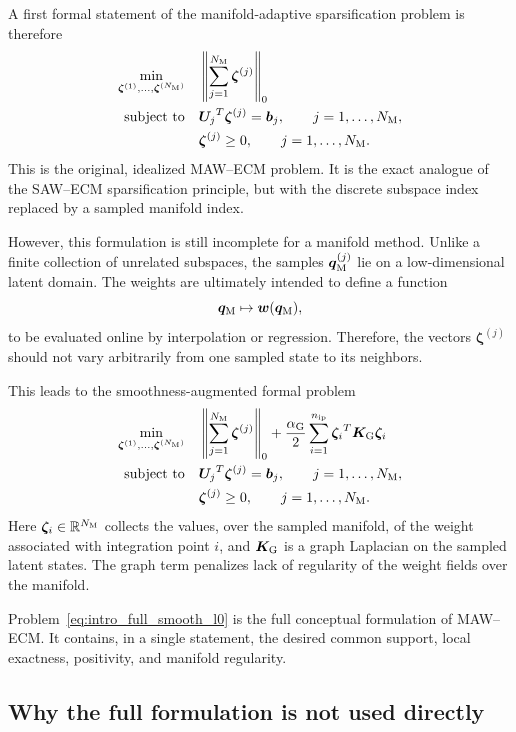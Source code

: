 \documentclass[11pt,a4paper]{article}
\begin{document}
A first formal statement of the manifold-adaptive sparsification problem is
therefore
\[
\begin{aligned}
\min_{\bm\zeta^{(1)},\ldots,\bm\zeta^{(N_{\mathrm{M}})}}
&\quad
\left\|
\sum_{j=1}^{N_{\mathrm{M}}}\bm\zeta^{(j)}
\right\|_0
\\
\text{subject to}
&\quad
{\bm U_j}^T\bm\zeta^{(j)}=\bm b_j,
\qquad
j=1,\ldots,N_{\mathrm{M}},
\\
&\quad
\bm\zeta^{(j)}\geq 0,
\qquad
j=1,\ldots,N_{\mathrm{M}}.
\end{aligned}
\label{eq:intro_full_maw_l0}
\]
This is the original, idealized MAW--ECM problem. It is the exact analogue of
the SAW--ECM sparsification principle, but with the discrete subspace index
replaced by a sampled manifold index.

However, this formulation is still incomplete for a manifold method. Unlike a
finite collection of unrelated subspaces, the samples $\bm q_{\mathrm{M}}^{(j)}$ lie on a
low-dimensional latent domain. The weights are ultimately intended to define a
function
\[
        \bm q_{\mathrm{M}}\mapsto\bm w(\bm q_{\mathrm{M}}),
\]
to be evaluated online by interpolation or regression. Therefore, the vectors
$\bm\zeta^{(j)}$ should not vary arbitrarily from one sampled state to its
neighbors.

This leads to the smoothness-augmented formal problem
\[
\begin{aligned}
\min_{\bm\zeta^{(1)},\ldots,\bm\zeta^{(N_{\mathrm{M}})}}
&\quad
\left\|
\sum_{j=1}^{N_{\mathrm{M}}}\bm\zeta^{(j)}
\right\|_0
+
\frac{\alpha_{\mathrm{G}}}{2}
\sum_{i=1}^{n_{\mathrm{ip}}}
{\bm\zeta_i}^T\bm K_{\mathrm{G}}\bm\zeta_i
\\
\text{subject to}
&\quad
{\bm U_j}^T\bm\zeta^{(j)}=\bm b_j,
\qquad
j=1,\ldots,N_{\mathrm{M}},
\\
&\quad
\bm\zeta^{(j)}\geq 0,
\qquad
j=1,\ldots,N_{\mathrm{M}}.
\end{aligned}
\label{eq:intro_full_smooth_l0}
\]
Here $\bm\zeta_i\in\mathbb{R}^{N_{\mathrm{M}}}$ collects the values, over the sampled manifold,
of the weight associated with integration point $i$, and $\bm K_{\mathrm{G}}$ is a graph
Laplacian on the sampled latent states. The graph term penalizes lack of
regularity of the weight fields over the manifold.

Problem~\eqref{eq:intro_full_smooth_l0} is the full conceptual formulation of
MAW--ECM. It contains, in a single statement, the desired common support, local
exactness, positivity, and manifold regularity.

\subsection{Why the full formulation is not used directly}
\end{document}
